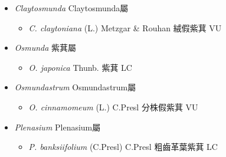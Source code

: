 
  \begin{itemize}
 \item[] \textit{Claytosmunda} Claytosmunda屬
                                
  \begin{itemize}
        \item[] \textit{C. claytoniana} (L.) Metzgar \& Rouhan  絨假紫萁   VU
  \end{itemize}
 \item[] \textit{Osmunda} 紫萁屬
                                
  \begin{itemize}
        \item[] \textit{O. japonica} Thunb.  紫萁   LC
  \end{itemize}
 \item[] \textit{Osmundastrum} Osmundastrum屬
                                
  \begin{itemize}
        \item[] \textit{O. cinnamomeum} (L.) C.Presl  分株假紫萁   VU
  \end{itemize}
 \item[] \textit{Plenasium} Plenasium屬
                                
  \begin{itemize}
        \item[] \textit{P. banksiifolium} (C.Presl) C.Presl  粗齒革葉紫萁   LC
  \end{itemize}
  \end{itemize}
